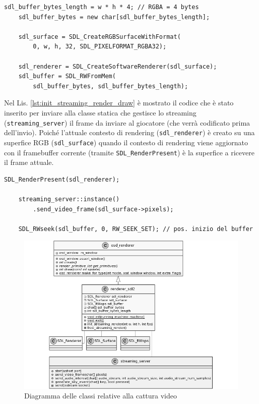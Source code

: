 \begin{lstlisting}[caption=Codice aggiunto per la cattura video: inizializzazione, label={lst:init_streaming_render_init}]
	sdl_buffer_bytes_length = w * h * 4; // RGBA = 4 bytes
	sdl_buffer_bytes = new char[sdl_buffer_bytes_length];

	sdl_surface = SDL_CreateRGBSurfaceWithFormat(
		0, w, h, 32, SDL_PIXELFORMAT_RGBA32);
	
	sdl_renderer = SDL_CreateSoftwareRenderer(sdl_surface);	
	sdl_buffer = SDL_RWFromMem(
		sdl_buffer_bytes, sdl_buffer_bytes_length);
\end{lstlisting}

Nel Lis. \ref{lst:init_streaming_render_draw} è mostrato il codice che è stato inserito per inviare alla classe statica che gestisce lo streaming (\verb|streaming_server|) il frame da inviare al giocatore (che verrà codificato prima dell'invio). Poiché l'attuale contesto di rendering (\verb|sdl_renderer|) è creato su una superfice RGB (\verb|sdl_surface|) quando il contesto di rendering viene aggiornato con il framebuffer corrente (tramite \verb|SDL_RenderPresent|) è la superfice a ricevere il frame attuale.

\begin{lstlisting}[caption=Codice aggiunto per la cattura video: disegno, label={lst:init_streaming_render_draw}]
	SDL_RenderPresent(sdl_renderer);

	streaming_server::instance()
		.send_video_frame(sdl_surface->pixels);

	SDL_RWseek(sdl_buffer, 0, RW_SEEK_SET); // pos. inizio del buffer
\end{lstlisting}

\begin{figure}[H]
	\includegraphics[width=\linewidth]{immagini/class_renderingSDLFull_Streaming}
	\caption{Diagramma delle classi relative alla cattura video}
	\label{fig:class_renderingSDLFull_Streaming}
\end{figure}

